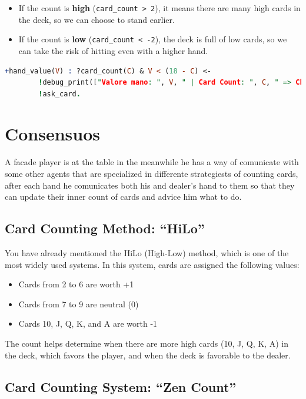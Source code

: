 \begin{itemize}
    \item If the count is \textbf{high} (\texttt{card\_count > 2}), it means there are many high cards in the deck, so we can choose to stand earlier.
    \item If the count is \textbf{low} (\texttt{card\_count < -2}), the deck is full of low cards, so we can take the risk of hitting even with a higher hand.
\end{itemize}

\begin{lstlisting}[language=Prolog]
    +hand_value(V) : ?card_count(C) & V < (18 - C) <-
        !debug_print(["Valore mano: ", V, " | Card Count: ", C, " => Chiedo carta!"]);
        !ask_card.
\end{lstlisting}

\section{Consensuos}

A facade player is at the table in the meanwhile he has a way of comunicate with some other agents that are specialized in differente strategiests of counting cards, after each hand he comunicates both his and dealer's hand to them so that they can update their inner count of cards and advice him what to do.

\subsection{Card Counting Method: ``HiLo''}

You have already mentioned the HiLo (High-Low) method, which is one of the most widely used systems. In this system, cards are assigned the following values:

\begin{itemize}
    \item Cards from 2 to 6 are worth +1
    \item Cards from 7 to 9 are neutral (0)
    \item Cards 10, J, Q, K, and A are worth -1
\end{itemize}

The count helps determine when there are more high cards (10, J, Q, K, A) in the deck, which favors the player, and when the deck is favorable to the dealer.

\subsection{Card Counting System: ``Zen Count''}

